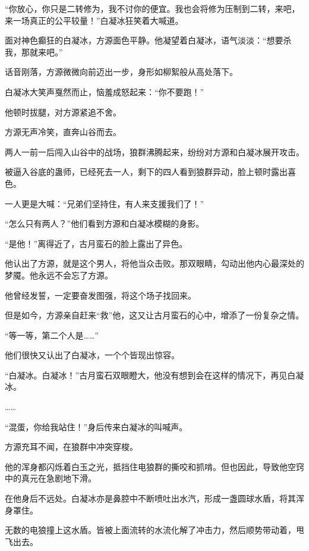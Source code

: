 
\begin{this_body}



“你放心，你只是二转修为，我不讨你的便宜。我也会将修为压制到二转，来吧，来一场真正的公平较量！”白凝冰狂笑着大喊道。

面对神色癫狂的白凝冰，方源面色平静。他凝望着白凝冰，语气淡淡：“想要杀我，那就来吧。”

话音刚落，方源微微向前迈出一步，身形如柳絮般从高处落下。

白凝冰大笑声戛然而止，恼羞成怒起来：“你不要跑！”

他顿时拔腿，对方源紧追不舍。

方源无声冷笑，直奔山谷而去。

两人一前一后闯入山谷中的战场，狼群沸腾起来，纷纷对方源和白凝冰展开攻击。

被逼入谷底的蛊师，已经死去一人，剩下的四人看到狼群异动，脸上顿时露出喜色。

一人更是大喊：“兄弟们坚持住，有人来支援我们了！”

“怎么只有两人？”他们看到方源和白凝冰模糊的身影。

“是他！”离得近了，古月蛮石的脸上露出了异色。

他认出了方源，就是这个男人，将他当众击败。那双眼睛，勾动出他内心最深处的梦魇。他永远不会忘了方源。

他曾经发誓，一定要奋发图强，将这个场子找回来。

但是如今，方源亲自赶来“救”他，这又让古月蛮石的心中，增添了一份复杂之情。

“等一等，第二个人是……”

他们很快又认出了白凝冰，一个个皆现出惊容。

“白凝冰。白凝冰！”古月蛮石双眼瞪大，他没有想到会在这样的情况下，再见白凝冰。

……

“混蛋，你给我站住！”身后传来白凝冰的叫喊声。

方源充耳不闻，在狼群中冲突穿梭。

他的浑身都闪烁着白玉之光，抵挡住电狼群的撕咬和抓啃。但也因此，导致他空窍中的真元在急剧地下滑。

在他身后不远处。白凝冰亦是鼻腔中不断喷吐出水汽，形成一盏圆球水盾，将其浑身罩住。

无数的电狼撞上这水盾。皆被上面流转的水流化解了冲击力，然后顺势带动着，甩飞出去。


\end{this_body}
